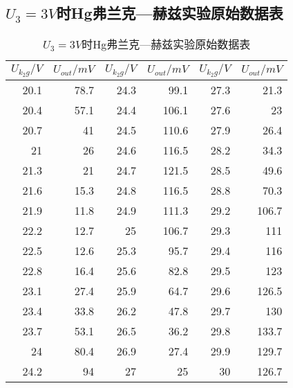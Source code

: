 \documentclass[a4 paper,12pt]{article}
\begin{document}
\subsection{$U_{3}=3V$时Hg弗兰克—赫兹实验原始数据表}
\begin{longtable}{||r|r||r|r||r|r||}
	\caption{$U_{3}=3V$时Hg弗兰克—赫兹实验原始数据表}\\
	\hline
	\hline
	$U_{k_{2}g}/V$&$U_{out}/mV$&	$U_{k_{2}g}/V$&$U_{out}/mV$&	$U_{k_{2}g}/V$&$U_{out}/mV$\\
	\hline
	\hline
		20.1  & 78.7  & 24.3  & 99.1  & 27.3  & 21.3 \\
		20.4  & 57.1  & 24.4  & 106.1 & 27.6  & 23 \\
		20.7  & 41    & 24.5  & 110.6 & 27.9  & 26.4 \\
		21    & 26    & 24.6  & 116.5 & 28.2  & 34.3 \\
		21.3  & 21    & 24.7  & 121.5 & 28.5  & 49.6 \\
		21.6  & 15.3  & 24.8  & 116.5 & 28.8  & 70.3 \\
		21.9  & 11.8  & 24.9  & 111.3 & 29.2  & 106.7 \\
		22.2  & 12.7  & 25    & 106.7 & 29.3  & 111 \\
		22.5  & 12.6  & 25.3  & 95.7  & 29.4  & 116 \\
		22.8  & 16.4  & 25.6  & 82.8  & 29.5  & 123 \\
		23.1  & 27.4  & 25.9  & 64.7  & 29.6  & 126.5 \\
		23.4  & 33.8  & 26.2  & 47.8  & 29.7  & 130 \\
		23.7  & 53.1  & 26.5  & 36.2  & 29.8  & 133.7 \\
		24    & 80.4  & 26.9  & 27.4  & 29.9  & 129.7 \\
		24.2  & 94    & 27    & 25    & 30    & 126.7 \\
		\hline
\end{longtable}
\end{document}
